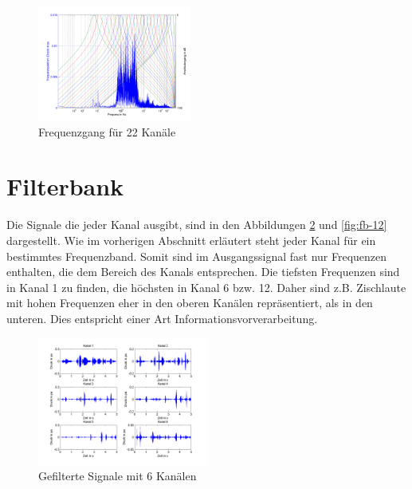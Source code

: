 \documentclass[conference]{IEEEtran}
\begin{document}
\begin{figure}[h]
	\vspace{-5pt}
	\centering
	\includegraphics[width=0.45\textwidth]{img/freq_gang_22.png}
	\vspace{-10pt}
	\caption{Frequenzgang für 22 Kanäle}
	\vspace{-20pt}
	\label{fig:freq-gang-22}
\end{figure}

\section{Filterbank}
Die Signale die jeder Kanal ausgibt, sind in den Abbildungen \ref{fig:fb-6} und \ref{fig:fb-12} dargestellt. Wie im vorherigen Abschnitt erläutert steht jeder Kanal für ein bestimmtes Frequenzband. Somit sind im Ausgangssignal fast nur Frequenzen enthalten, die dem Bereich des Kanals entsprechen. Die tiefsten Frequenzen sind in Kanal 1 zu finden, die höchsten in Kanal 6 bzw. 12. Daher sind z.B. Zischlaute mit hohen Frequenzen eher in den oberen Kanälen repräsentiert, als in den unteren. Dies entspricht einer Art Informationsvorverarbeitung. 
\begin{figure}[h]
	\vspace{-5pt}
	\centering
	\includegraphics[width=0.5\textwidth]{img/fb_6.png}
	\vspace{-20pt}
	\caption{Gefilterte Signale mit 6 Kanälen}
	\vspace{-20pt}
	\label{fig:fb-6}
\end{figure}
\end{document}
